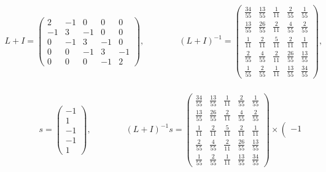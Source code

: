 \begin{equation}
	\begin{aligned}
		\\
		L+I=
		\left(\begin{matrix}
		2 & -1 & 0 & 0 & 0 \\
		-1 & 3 & -1 & 0 & 0 \\
		0 & -1 & 3 & -1 & 0 \\
		0 & 0 & -1 & 3 & -1 \\
		0 & 0 & 0 & -1 & 2
		\end{matrix}\right),
		\qquad \qquad 
		(L+I)^{-1}=
		\left(\begin{matrix}
		\frac{34}{55} & \frac{13}{55} & \frac{1}{11} & \frac{2}{55} & \frac{1}{55} \\
		\frac{13}{55} & \frac{26}{55} & \frac{2}{11} & \frac{4}{55} & \frac{2}{55} \\
		\frac{1}{11} & \frac{2}{11} & \frac{5}{11} & \frac{2}{11} & \frac{1}{11} \\
		\frac{2}{55} & \frac{4}{55} & \frac{2}{11} & \frac{26}{55} & \frac{13}{55} \\
		\frac{1}{55} & \frac{2}{55} & \frac{1}{11} & \frac{13}{55} & \frac{34}{55}
		\end{matrix}\right)
		,
		\\
		\\
		\\
		\\
		\qquad \qquad
		s=
		\left(\begin{matrix}
		-1 \\
		1 \\
		-1 \\
		-1 \\
		1
		\end{matrix}\right)
		,
		\qquad \qquad
		(L+I)^{-1}s=
		\left(\begin{matrix}
		\frac{34}{55} & \frac{13}{55} & \frac{1}{11} & \frac{2}{55} & \frac{1}{55} \\
		\frac{13}{55} & \frac{26}{55} & \frac{2}{11} & \frac{4}{55} & \frac{2}{55} \\
		\frac{1}{11} & \frac{2}{11} & \frac{5}{11} & \frac{2}{11} & \frac{1}{11} \\
		\frac{2}{55} & \frac{4}{55} & \frac{2}{11} & \frac{26}{55} & \frac{13}{55} \\
		\frac{1}{55} & \frac{2}{55} & \frac{1}{11} & \frac{13}{55} & \frac{34}{55}
		\end{matrix}\right)
		\times
		\left(\begin{matrix}
		-1 \\

\end{matrix}
\end{aligned}
\end{equation}
